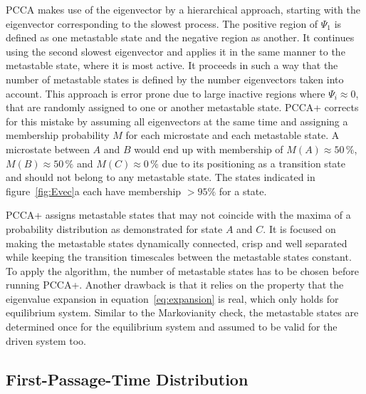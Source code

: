 PCCA makes use of the eigenvector by a hierarchical approach, starting with the eigenvector corresponding to the slowest process. The positive region of $\Psi_1$ is defined as one metastable state and the negative region as another. It continues using the second slowest eigenvector and applies it in the same manner to the metastable state, where it is most active. It proceeds in such a way that the number of metastable states is defined by the number eigenvectors taken into account. This approach is error prone due to large inactive regions where $\Psi_i \approx 0$, that are randomly assigned to one or another metastable state. PCCA+ corrects for this mistake by assuming all eigenvectors at the same time and assigning a membership probability $M$ for each microstate and each metastable state. A microstate between $A$ and $B$ would end up with membership of $M(A) \approx 50\,\%$, $M(B) \approx 50\,\%$ and $M(C) \approx 0\,\%$ due to its positioning as a transition state and should not belong to any metastable state. The states indicated in figure~\ref{fig:Evec}a each have membership $>95\%$ for a state. 

PCCA+ assigns metastable states that may not coincide with the maxima of a probability distribution as demonstrated for state $A$ and $C$. It is focused on making the metastable states dynamically connected, crisp and well separated while keeping the transition timescales between the metastable states constant. To apply the algorithm, the number of metastable states has to be chosen before running PCCA+. Another drawback is that it relies on the property that the 
eigenvalue expansion in equation~\ref{eq:expansion} is real, which only holds for equilibrium system. Similar to the Markovianity check, the metastable states are determined once for the equilibrium system and assumed to be valid for the driven system too. 

\subsection{First-Passage-Time Distribution}
\label{sec:FPTD}


